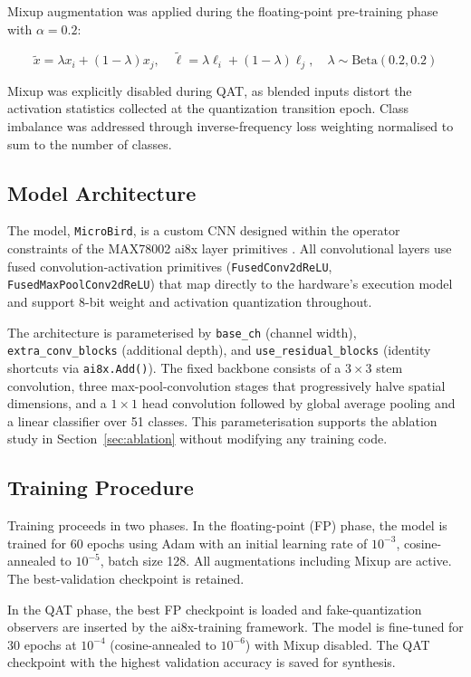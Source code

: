 \documentclass[conference]{IEEEtran}
\begin{document}
Mixup augmentation \cite{zhang2018mixup} was applied during the floating-point pre-training phase with $\alpha = 0.2$:

\begin{equation}
\tilde{x} = \lambda x_i + (1-\lambda)x_j,
\quad
\tilde{\ell} = \lambda \ell_i + (1-\lambda)\ell_j, \quad \lambda \sim \mathrm{Beta}(0.2,0.2)
\end{equation}

Mixup was explicitly disabled during QAT, as blended inputs distort the activation statistics collected at the quantization transition epoch. Class imbalance was addressed through inverse-frequency loss weighting normalised to sum to the number of classes.

\subsection{Model Architecture}
The model, \texttt{MicroBird}, is a custom CNN designed within the operator constraints of the MAX78002 ai8x layer primitives \cite{adi2022training}. All convolutional layers use fused convolution-activation primitives (\texttt{FusedConv2dReLU}, \texttt{FusedMaxPoolConv2dReLU}) that map directly to the hardware's execution model and support 8-bit weight and activation quantization throughout.

The architecture is parameterised by \texttt{base\_ch} (channel width), \texttt{extra\_conv\_blocks} (additional depth), and \texttt{use\_residual\_blocks} (identity shortcuts via \texttt{ai8x.Add()}). The fixed backbone consists of a $3{\times}3$ stem convolution, three max-pool-convolution stages that progressively halve spatial dimensions, and a $1{\times}1$ head convolution followed by global average pooling and a linear classifier over 51 classes. This parameterisation supports the ablation study in Section~\ref{sec:ablation} without modifying any training code.

\subsection{Training Procedure}
Training proceeds in two phases. In the floating-point (FP) phase, the model is trained for 60 epochs using Adam with an initial learning rate of $10^{-3}$, cosine-annealed to $10^{-5}$, batch size 128. All augmentations including Mixup are active. The best-validation checkpoint is retained.

In the QAT phase, the best FP checkpoint is loaded and fake-quantization observers are inserted by the ai8x-training framework. The model is fine-tuned for 30 epochs at $10^{-4}$ (cosine-annealed to $10^{-6}$) with Mixup disabled. The QAT checkpoint with the highest validation accuracy is saved for synthesis.
\end{document}
